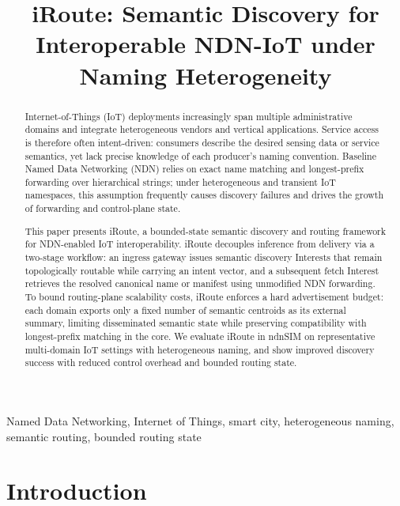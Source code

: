 \documentclass[journal]{IEEEtran}
\newcommand{\sysname}{iRoute}
\begin{document}
\title{iRoute: Semantic Discovery for Interoperable NDN-IoT under Naming Heterogeneity}

\author{}

\markboth{}%

\maketitle

\begin{abstract}
Internet-of-Things (IoT) deployments increasingly span multiple administrative domains and integrate heterogeneous vendors and vertical applications. Service access is therefore often intent-driven: consumers describe the desired sensing data or service semantics, yet lack precise knowledge of each producer's naming convention. Baseline Named Data Networking (NDN) relies on exact name matching and longest-prefix forwarding over hierarchical strings; under heterogeneous and transient IoT namespaces, this assumption frequently causes discovery failures and drives the growth of forwarding and control-plane state.

This paper presents \sysname{}, a bounded-state semantic discovery and routing framework for NDN-enabled IoT interoperability. \sysname{} decouples inference from delivery via a two-stage workflow: an ingress gateway issues semantic discovery Interests that remain topologically routable while carrying an intent vector, and a subsequent fetch Interest retrieves the resolved canonical name or manifest using unmodified NDN forwarding. To bound routing-plane scalability costs, \sysname{} enforces a hard advertisement budget: each domain exports only a fixed number of semantic centroids as its external summary, limiting disseminated semantic state while preserving compatibility with longest-prefix matching in the core. We evaluate \sysname{} in ndnSIM on representative multi-domain IoT settings with heterogeneous naming, and show improved discovery success with reduced control overhead and bounded routing state.
\end{abstract}

\begin{IEEEkeywords}
Named Data Networking, Internet of Things, smart city, heterogeneous naming, semantic routing, bounded routing state
\end{IEEEkeywords}

\IEEEpeerreviewmaketitle


\section{Introduction}
\label{sec:introduction}
\end{document}
